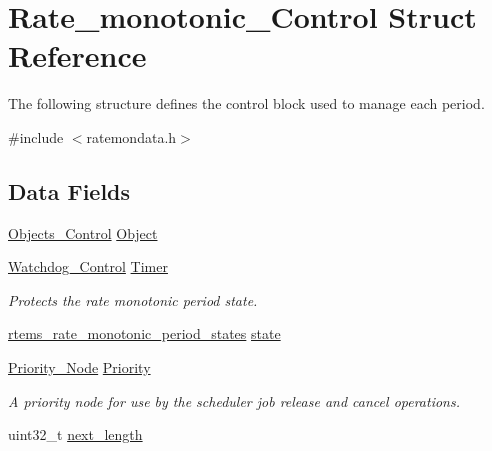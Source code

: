 \hypertarget{structRate__monotonic__Control}{}\section{Rate\+\_\+monotonic\+\_\+\+Control Struct Reference}
\label{structRate__monotonic__Control}


The following structure defines the control block used to manage each period.  




{\ttfamily \#include $<$ratemondata.\+h$>$}

\subsection*{Data Fields}
\begin{DoxyCompactItemize}
\item 
\mbox{\hyperlink{structObjects__Control}{Objects\+\_\+\+Control}} \mbox{\hyperlink{structRate__monotonic__Control_a03fc19c9c36d03112da8ec05cc9f5054}{Object}}
\item 
\mbox{\hyperlink{structWatchdog__Control}{Watchdog\+\_\+\+Control}} \mbox{\hyperlink{structRate__monotonic__Control_a4bdcf4d867dc6a8395c7da359e2a559d}{Timer}}
\begin{DoxyCompactList}\small\item\em Protects the rate monotonic period state. \end{DoxyCompactList}\item 
\mbox{\hyperlink{group__ClassicRateMon_ga0fd6fa9e7304b022e004061d542ca743}{rtems\+\_\+rate\+\_\+monotonic\+\_\+period\+\_\+states}} \mbox{\hyperlink{structRate__monotonic__Control_af28511a5363f94b4e136635e56c4d846}{state}}
\item 
\mbox{\label{structRate__monotonic__Control_abf78e006586f141540783237efd84ada}} 
\mbox{\hyperlink{structPriority__Node}{Priority\+\_\+\+Node}} \mbox{\hyperlink{structRate__monotonic__Control_abf78e006586f141540783237efd84ada}{Priority}}
\begin{DoxyCompactList}\small\item\em A priority node for use by the scheduler job release and cancel operations. \end{DoxyCompactList}\item 
uint32\+\_\+t \mbox{\hyperlink{structRate__monotonic__Control_a3565f22c218535127cdcc2e3d7e6953b}{next\+\_\+length}}
\item 

\end{DoxyCompactItemize}
